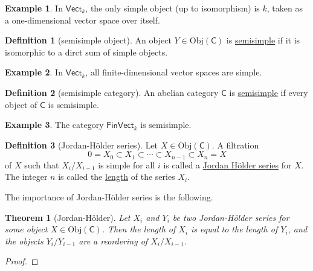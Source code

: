 \documentclass[a4paper]{report}
\newcommand{\defn}[1]{\ul{#1}}
\newcommand{\Obj}{\mathrm{Obj}}
\theoremstyle{definition}
\newtheorem{definition}{Definition}[section]
\newtheorem{example}{Example}[section]
\theoremstyle{plain}
\newtheorem{theorem}{Theorem}[section]
\theoremstyle{remark}
\begin{document}
\begin{example}
  In $\mathsf{Vect}_{k}$, the only simple object (up to isomorphism) is $k$, taken as a one-dimensional vector space over itself.
\end{example}

\begin{definition}[semisimple object]
  \label{def:semisimpleobject}
  An object $Y \in \Obj(\mathsf{C})$ is \defn{semisimple} if it is isomorphic to a dirct sum of simple objects.
\end{definition}

\begin{example}
  In $\mathsf{Vect}_{k}$, all finite-dimensional vector spaces are simple.
\end{example}

\begin{definition}[semisimple category]
  \label{def:semisimple category}
  An abelian category $\mathsf{C}$ is \defn{semisimple} if every object of $\mathsf{C}$ is semisimple.
\end{definition}

\begin{example}
  The category $\mathsf{FinVect}_{k}$ is semisimple.
\end{example}

\begin{definition}[Jordan-H{\"o}lder series]
  \label{def:jordanholderseries}
  Let $X \in \Obj(\mathsf{C})$. A filtration 
  \begin{equation*}
    0 = X_{0} \subset X_{1} \subset \cdots \subset X_{n-1} \subset X_{n} = X
  \end{equation*}
  of $X$ such that $X_{i} / X_{i-1}$ is simple for all $i$ is called a \defn{Jordan H{\"o}lder series} for $X$. The integer $n$ is called the \defn{length} of the series $X_{i}$.
\end{definition}

The importance of Jordan-H{\"o}lder series is the following.

\begin{theorem}[Jordan-H{\"o}lder]
  Let $X_{i}$ and $Y_{i}$ be two Jordan-H{\"o}lder series for some object $X \in \Obj(\mathsf{C})$. Then the length of $X_{i}$ is equal to the length of $Y_{i}$, and the objects $Y_{i}/Y_{i-1}$ are a reordering of $X_{i}/X_{i-1}$.
\end{theorem}
\begin{proof}

\end{proof}
\end{document}

